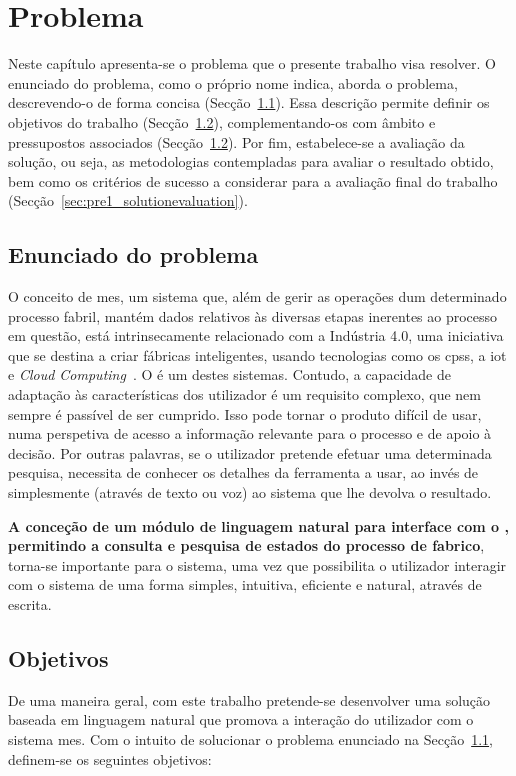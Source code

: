 \chapter{Problema}
\label{chap:pre1}

Neste capítulo apresenta-se o problema que o presente trabalho visa resolver. O enunciado do problema, como o próprio nome indica, aborda o problema, descrevendo-o de forma concisa (Secção~\ref{sec:pre1_problem}). Essa descrição permite definir os objetivos do trabalho (Secção~\ref{sec:pre1_objectives}), complementando-os com âmbito e pressupostos associados (Secção~\ref{sec:pre1_objectives}). Por fim, estabelece-se a avaliação da solução, ou seja, as metodologias contempladas para avaliar o resultado obtido, bem como os critérios de sucesso a considerar para a avaliação final do trabalho (Secção~\ref{sec:pre1_solutionevaluation}).

\section{Enunciado do problema}
\label{sec:pre1_problem}

O conceito de \gls{mes}, um sistema que, além de gerir as operações dum determinado processo fabril, mantém dados relativos às diversas etapas inerentes ao processo em questão, está intrinsecamente relacionado com a Indústria 4.0, uma iniciativa que se destina a criar fábricas inteligentes, usando tecnologias como os \glspl{cps}, a \gls{iot} e \textit{Cloud Computing}~\parencite{intelligent_manufacturing_context_industry40_review}. O {\productname} é um destes sistemas. Contudo, a capacidade de adaptação às características dos utilizador é um requisito complexo, que nem sempre é passível de ser cumprido. Isso pode tornar o produto difícil de usar, numa perspetiva de acesso a informação relevante para o processo e de apoio à decisão. Por outras palavras, se o utilizador pretende efetuar uma determinada pesquisa, necessita de conhecer os detalhes da ferramenta a usar, ao invés de simplesmente  (através de texto ou voz) ao sistema que lhe devolva o resultado.

\textbf{A conceção de um módulo de linguagem natural para interface com o {\productname}, permitindo a consulta e pesquisa de estados do processo de fabrico}, torna-se importante para o sistema, uma vez que possibilita o utilizador interagir com o sistema de uma forma simples, intuitiva, eficiente e natural, através de escrita.

\section{Objetivos}
\label{sec:pre1_objectives}
De uma maneira geral, com este trabalho pretende-se desenvolver uma solução baseada em linguagem natural que promova a interação do utilizador com o sistema \gls{mes}. Com o intuito de solucionar o problema enunciado na Secção~\ref{sec:pre1_problem}, definem-se os seguintes objetivos:

